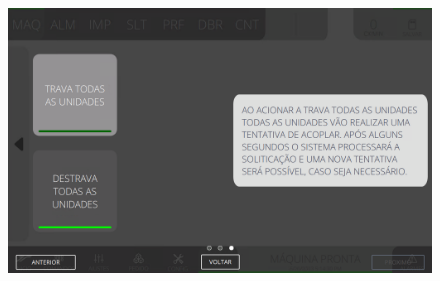 \begin{figure}[h]
  \centering
  \includegraphics[width=576px,height=360px]{src/imagesMiniline/02-Machine/commands/e3.png}
\end{figure}

\vspace*{\fill}


